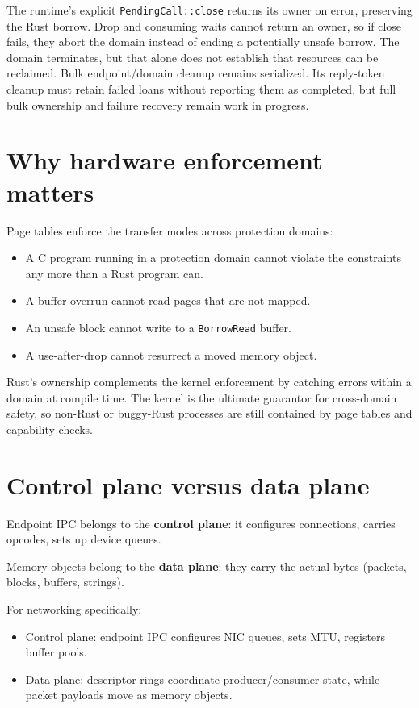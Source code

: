The runtime's explicit \texttt{PendingCall::close} returns its owner on error,
preserving the Rust borrow. Drop and consuming waits cannot return an owner, so
if close fails, they abort the domain instead of ending a potentially unsafe
borrow. The domain terminates, but that alone does not establish that resources
can be reclaimed.
Bulk endpoint/domain cleanup remains serialized. Its reply-token cleanup must
retain failed loans without reporting them as completed, but full bulk ownership
and failure recovery remain work in progress.

\section{Why hardware enforcement matters}

Page tables enforce the transfer modes across protection domains:

\begin{itemize}
    \item A C program running in a protection domain cannot violate the
        constraints any more than a Rust program can.
    \item A buffer overrun cannot read pages that are not mapped.
    \item An unsafe block cannot write to a \texttt{BorrowRead} buffer.
    \item A use-after-drop cannot resurrect a moved memory object.
\end{itemize}

Rust's ownership complements the kernel enforcement by catching errors within a
domain at compile time. The kernel is the ultimate guarantor for cross-domain
safety, so non-Rust or buggy-Rust processes are still contained by page tables and
capability checks.

\section{Control plane versus data plane}

Endpoint IPC belongs to the \textbf{control plane}: it configures connections,
carries opcodes, sets up device queues.

Memory objects belong to the \textbf{data plane}: they carry the actual bytes
(packets, blocks, buffers, strings).

For networking specifically:

\begin{itemize}
    \item Control plane: endpoint IPC configures NIC queues, sets MTU,
        registers buffer pools.
    \item Data plane: descriptor rings coordinate producer/consumer
        state, while packet payloads move as memory objects.
\end{itemize}

